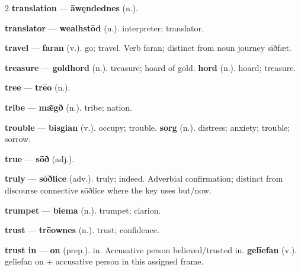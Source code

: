 \begin{multicols}{2}
\textbf{translation} — \textbf{āwęndednes} (n.).\par
\textbf{translator} — \textbf{wealhstōd} (n.). interpreter; translator.\par
\textbf{travel} — \textbf{faran} (v.). go; travel. Verb faran; distinct from noun journey sīðfæt.\par
\textbf{treasure} — \textbf{goldhord} (n.). treasure; hoard of gold. \textbf{hord} (n.). hoard; treasure.\par
\textbf{tree} — \textbf{trēo} (n.).\par
\textbf{tribe} — \textbf{mǣgð} (n.). tribe; nation.\par
\textbf{trouble} — \textbf{bisgian} (v.). occupy; trouble. \textbf{sorg} (n.). distress; anxiety; trouble; sorrow.\par
\textbf{true} — \textbf{sōð} (adj.).\par
\textbf{truly} — \textbf{sōðlice} (adv.). truly; indeed. Adverbial confirmation; distinct from discourse connective sōðlice where the key uses but/now.\par
\textbf{trumpet} — \textbf{biema} (n.). trumpet; clarion.\par
\textbf{trust} — \textbf{trēownes} (n.). trust; confidence.\par
\textbf{trust in} — \textbf{on} (prep.). in. Accusative person believed/trusted in. \textbf{gelīefan} (v.). gelīefan on + accusative person in this assigned frame.\par

\end{multicols}
